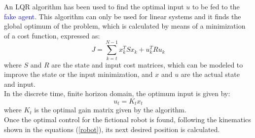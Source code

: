 An LQR algorithm \cite{} has been used to find the optimal input $u$ to be fed to the \textcolor{blue}{fake agent}. This algorithm can only be used for linear systems and it finds the global optimum of the problem, which is calculated by means of a minimization of a cost function, expressed as:
\begin{equation}
    J = \sum_{k=t}^{N-1} x_k^TSx_k + u_k^TRu_k
\end{equation}
where $S$ and $R$ are the state and input cost matrices, which can be modeled to improve the state or the input minimization, and $x$ and $u$ are the actual state and input.\\
In the discrete time, finite horizon domain, the optimum input is given by:
\begin{equation}
    u_t=K_tx_t 
\end{equation}
where $K_t$ is the optimal gain matrix given by the algorithm.\\
Once the optimal control for the fictional robot is found, following the kinematics shown in the equations (\ref{robot}), its next desired position is calculated.\\
